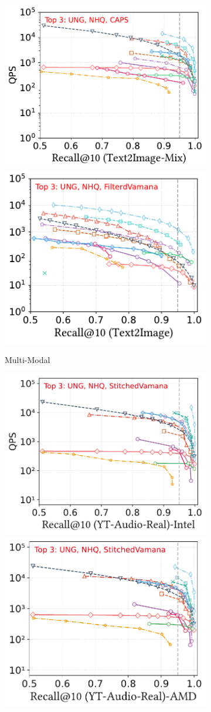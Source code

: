\documentclass[sigconf, nonacm]{acmart}
\begin{document}
{\begin{figure}[t]
	\begin{subfigure}[b]{0.38\textwidth}
		\centering
		\includegraphics[width=0.495\linewidth]{figures/exp/attribute_multimodel.pdf}
		\hfill 
		\includegraphics[width=0.47\linewidth]{figures/exp/attribute_multimodel_1.pdf}
		\caption{Multi-Modal}
		\label{fig:attribute-multimodal} 
	\end{subfigure}
	\hfill %
	\begin{subfigure}[b]{0.39\textwidth}
		\centering
		\includegraphics[width=0.495\linewidth]{figures/exp/attribute_85.pdf}
		\hfill
		\includegraphics[width=0.47\linewidth]{figures/exp/attribute_71.pdf}

\end{subfigure}
\end{figure}}
\end{document}
